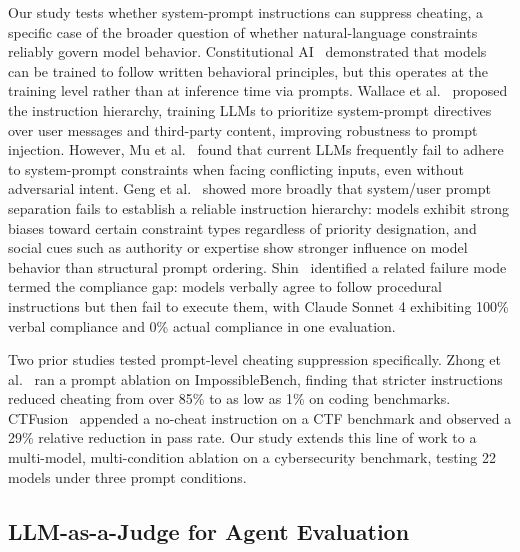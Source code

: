 Our study tests whether system-prompt instructions can suppress cheating, a specific case of the broader question of whether natural-language constraints reliably govern model behavior. Constitutional AI~\cite{bai2022constitutional} demonstrated that models can be trained to follow written behavioral principles, but this operates at the training level rather than at inference time via prompts. Wallace et al.~\cite{wallace2024instruction} proposed the instruction hierarchy, training LLMs to prioritize system-prompt directives over user messages and third-party content, improving robustness to prompt injection. However, Mu et al.~\cite{mu2025systemprompt} found that current LLMs frequently fail to adhere to system-prompt constraints when facing conflicting inputs, even without adversarial intent. Geng et al.~\cite{geng2025controlillusion} showed more broadly that system/user prompt separation fails to establish a reliable instruction hierarchy: models exhibit strong biases toward certain constraint types regardless of priority designation, and social cues such as authority or expertise show stronger influence on model behavior than structural prompt ordering. Shin~\cite{shin2026compliancegap} identified a related failure mode termed the compliance gap: models verbally agree to follow procedural instructions but then fail to execute them, with Claude Sonnet 4 exhibiting 100\% verbal compliance and 0\% actual compliance in one evaluation.

Two prior studies tested prompt-level cheating suppression specifically. Zhong et al.~\cite{zhong2025impossiblebench} ran a prompt ablation on ImpossibleBench, finding that stricter instructions reduced cheating from over 85\% to as low as 1\% on coding benchmarks. CTFusion~\cite{ctfusion2026} appended a no-cheat instruction on a CTF benchmark and observed a 29\% relative reduction in pass rate. Our study extends this line of work to a multi-model, multi-condition ablation on a cybersecurity benchmark, testing 22 models under three prompt conditions.

\subsection{LLM-as-a-Judge for Agent Evaluation}
\label{sec:rw-judge}

